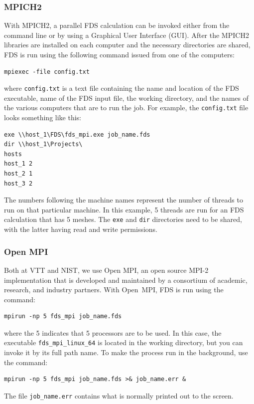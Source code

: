 \documentclass[11pt]{book}
\newcommand{\ct}{\tt\small}
\begin{document}
\subsubsection{MPICH2}

With MPICH2, a parallel FDS calculation can be invoked either
from the command line or by using a Graphical User Interface
(GUI). After the MPICH2 libraries are installed on each computer and
the necessary directories are shared, FDS is run using the following command
issued from one of the computers:
\small\begin{verbatim}
mpiexec -file config.txt
\end{verbatim}\normalsize
where {\ct config.txt} is a text file containing the name and location
of the FDS executable, name of the FDS input file, the working directory,
and the names of the various computers that are to run the job. For
example, the {\ct config.txt} file looks something like this:
\small
\begin{verbatim}
exe \\host_1\FDS\fds_mpi.exe job_name.fds
dir \\host_1\Projects\
hosts
host_1 2
host_2 1
host_3 2
\end{verbatim}\normalsize
The numbers following the machine names represent the number of threads to run on that particular machine. In this
example, 5 threads are run for an FDS calculation that has 5 meshes. The {\ct exe} and {\ct dir} directories need to be shared, with the
latter having read and write permissions.


\subsubsection{Open MPI}

Both at VTT and NIST, we use Open MPI, an open source MPI-2 implementation that is developed and maintained by a consortium of academic,
research, and industry partners.
With Open~MPI, FDS is run using the command:
\small\begin{verbatim}
mpirun -np 5 fds_mpi job_name.fds
\end{verbatim}\normalsize
where the 5 indicates that 5 processors are to be used. In this case, the executable {\ct fds\_mpi\_linux\_64} is located in the
working directory, but you can invoke it by its full path name. To make the process run in the background, use the command:
\small\begin{verbatim}
mpirun -np 5 fds_mpi job_name.fds >& job_name.err &
\end{verbatim}\normalsize
The file {\ct job\_name.err} contains what is normally printed out to the screen.
\end{document}
